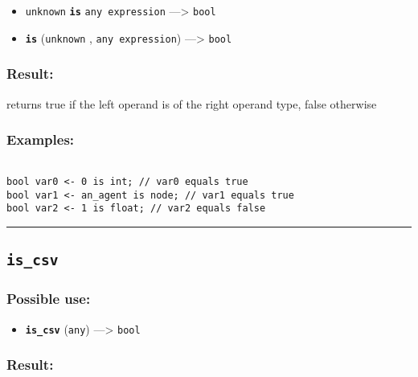 \documentclass[]{book}
\providecommand{\tightlist}{%
  \setlength{\itemsep}{0pt}\setlength{\parskip}{0pt}}
\theoremstyle{definition}
\theoremstyle{definition}
\theoremstyle{definition}
\theoremstyle{remark}
\begin{document}
\begin{itemize}
\tightlist
\item
  \texttt{unknown} \textbf{\texttt{is}} \texttt{any\ expression}
  ---\textgreater{} \texttt{bool}
\item
  \textbf{\texttt{is}} (\texttt{unknown} , \texttt{any\ expression})
  ---\textgreater{} \texttt{bool}
\end{itemize}

\subsubsection{Result:}\label{result-274}

returns true if the left operand is of the right operand type, false
otherwise

\subsubsection{Examples:}\label{examples-214}

\begin{verbatim}
 
bool var0 <- 0 is int; // var0 equals true 
bool var1 <- an_agent is node; // var1 equals true 
bool var2 <- 1 is float; // var2 equals false
\end{verbatim}

\begin{center}\rule{0.5\linewidth}{\linethickness}\end{center}

\subsection{\texorpdfstring{\texttt{is\_csv}}{is\_csv}}\label{is_csv}

\subsubsection{Possible use:}\label{possible-use-285}

\begin{itemize}
\tightlist
\item
  \textbf{\texttt{is\_csv}} (\texttt{any}) ---\textgreater{}
  \texttt{bool}
\end{itemize}

\subsubsection{Result:}\label{result-275}
\end{document}

